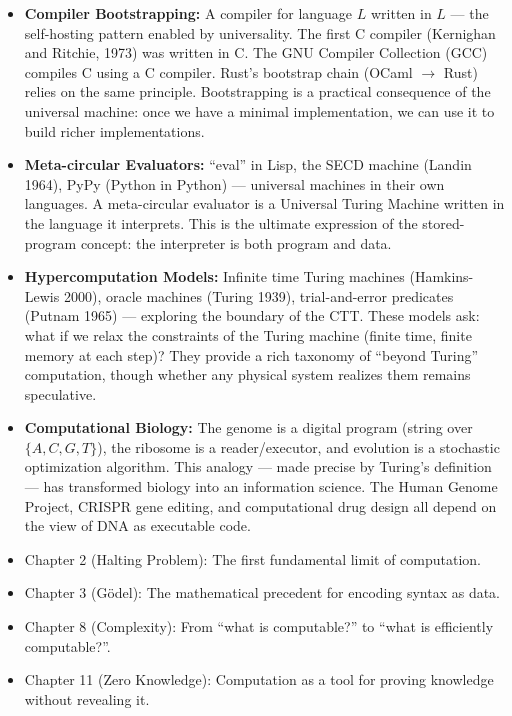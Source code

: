 \begin{itemize}
\item \textbf{Compiler Bootstrapping:} A compiler for language $L$ written in $L$ --- the self-hosting pattern enabled by universality. The first C compiler (Kernighan and Ritchie, 1973) was written in C. The GNU Compiler Collection (GCC) compiles C using a C compiler. Rust's bootstrap chain (OCaml $\to$ Rust) relies on the same principle. Bootstrapping is a practical consequence of the universal machine: once we have a minimal implementation, we can use it to build richer implementations.

\item \textbf{Meta-circular Evaluators:} ``eval'' in Lisp, the SECD machine (Landin 1964), PyPy (Python in Python) --- universal machines in their own languages. A meta-circular evaluator is a Universal Turing Machine written in the language it interprets. This is the ultimate expression of the stored-program concept: the interpreter is both program and data.

\item \textbf{Hypercomputation Models:} Infinite time Turing machines (Hamkins-Lewis 2000), oracle machines (Turing 1939), trial-and-error predicates (Putnam 1965) --- exploring the boundary of the CTT. These models ask: what if we relax the constraints of the Turing machine (finite time, finite memory at each step)? They provide a rich taxonomy of ``beyond Turing'' computation, though whether any physical system realizes them remains speculative.

\item \textbf{Computational Biology:} The genome is a digital program (string over $\{A, C, G, T\}$), the ribosome is a reader/executor, and evolution is a stochastic optimization algorithm. This analogy --- made precise by Turing's definition --- has transformed biology into an information science. The Human Genome Project, CRISPR gene editing, and computational drug design all depend on the view of DNA as executable code.
\end{itemize}

\begin{itemize}
\item Chapter 2 (Halting Problem): The first fundamental limit of computation.
\item Chapter 3 (G\"odel): The mathematical precedent for encoding syntax as data.
\item Chapter 8 (Complexity): From ``what is computable?'' to ``what is efficiently computable?''.
\item Chapter 11 (Zero Knowledge): Computation as a tool for proving knowledge without revealing it.
\end{itemize}

